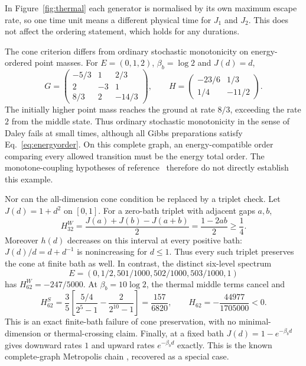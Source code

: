 \documentclass[11pt,a4paper]{article}
\theoremstyle{remark}\newtheorem{remark}[theorem]{Remark}
\begin{document}
In Figure~\ref{fig:thermal} each generator is normalised by its own maximum escape rate, so one time unit means a different physical time for $J_1$ and $J_2$. This does not affect the ordering statement, which holds for any durations.

The cone criterion differs from ordinary stochastic monotonicity on energy-ordered point masses. For $E=(0,1,2)$, $\beta_b=\log2$ and $J(d)=d$,
\begin{equation}
 G=\begin{pmatrix}-5/3&1&2/3\\2&-3&1\\8/3&2&-14/3\end{pmatrix},
 \qquad
 H=\begin{pmatrix}-23/6&1/3\\1/4&-11/2\end{pmatrix}.
 \label{eq:three}
\end{equation}
The initially higher point mass reaches the ground at rate $8/3$, exceeding the rate $2$ from the middle state. Thus ordinary stochastic monotonicity in the sense of Daley \cite{Daley1968} fails at small times, although all Gibbs preparations satisfy Eq.~\eqref{eq:energyorder}. On this complete graph, an energy-compatible order comparing every allowed transition must be the energy total order. The monotone-coupling hypotheses of reference~\cite{Ohga2024} therefore do not directly establish this example.

Nor can the all-dimension cone condition be replaced by a triplet check. Let $J(d)=1+d^2$ on $[0,1]$. For a zero-bath triplet with adjacent gaps $a,b$,
\begin{equation}
 H^W_{32}=\frac{J(a)+J(b)-J(a+b)}2
 =\frac{1-2ab}{2}\ge\frac14.
\end{equation}
Moreover $h(d)$ decreases on this interval at every positive bath: $J(d)/d=d+d^{-1}$ is nonincreasing for $d\le1$. Thus every such triplet preserves the cone at finite bath as well. In contrast, the distinct six-level spectrum
\begin{equation}
 E=(0,1/2,501/1000,502/1000,503/1000,1)
\end{equation}
has $H^W_{62}=-247/5000$. At $\beta_b=10\log2$, the thermal middle terms cancel and
\begin{equation}
 H^S_{62}=\frac35\left[\frac{5/4}{2^5-1}-\frac2{2^{10}-1}\right]
 =\frac{157}{6820},\qquad
 H_{62}=-\frac{44977}{1705000}<0.
 \label{eq:six}
\end{equation}
This is an exact finite-bath failure of cone preservation, with no minimal-dimension or thermal-crossing claim. Finally, at a fixed bath $J(d)=1-e^{-\beta_b d}$ gives downward rates $1$ and upward rates $e^{-\beta_b d}$ exactly. This is the known complete-graph Metropolis chain \cite{Klich2019}, recovered as a special case.
\end{document}
